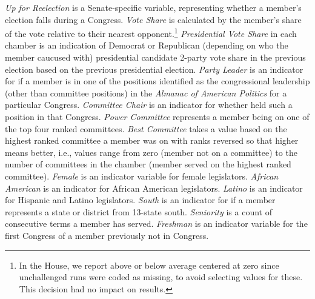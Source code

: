 \documentclass[12pt]{article}
\begin{document}
\textit{Up for Reelection} is a Senate-specific variable, representing whether a member's election falls during a Congress.
\textit{Vote Share} is calculated by the member's share of the vote relative to their nearest opponent.\footnote{\doublespacing\normalsize In the House, we report above or below average centered at zero since unchallenged runs were coded as missing, to avoid selecting values for these. This decision had no impact on results.}  \textit{Presidential Vote Share} in each chamber is an indication of Democrat or Republican (depending on who the member caucused with) presidential candidate 2-party vote share in the previous election based on the previous presidential election.  \textit{Party Leader} is an indicator for if a member is in one of the positions identified as the congressional leadership (other than committee positions) in the \textit{Almanac of American Politics} for a particular Congress. \textit{Committee Chair} is an indicator for whether held such a position in that Congress.  \textit{Power Committee} represents a member being on one of the top four ranked committees.  \textit{Best Committee} takes a value based on the highest ranked committee a member was on with ranks reversed so that higher means better, i.e., values range from zero (member not on a committee) to the number of committees in the chamber (member served on the highest ranked committee).  \textit{Female} is an indicator variable for female legislators.  \textit{African American} is an indicator for African American legislators.  \textit{Latino} is an indicator for Hispanic and Latino legislators.  \textit{South} is an indicator for if a member represents a state or district from 13-state south.  \textit{Seniority} is a count of consecutive terms a member has served.  \textit{Freshman} is an indicator variable for the first Congress of a member previously not in Congress.
\end{document}
